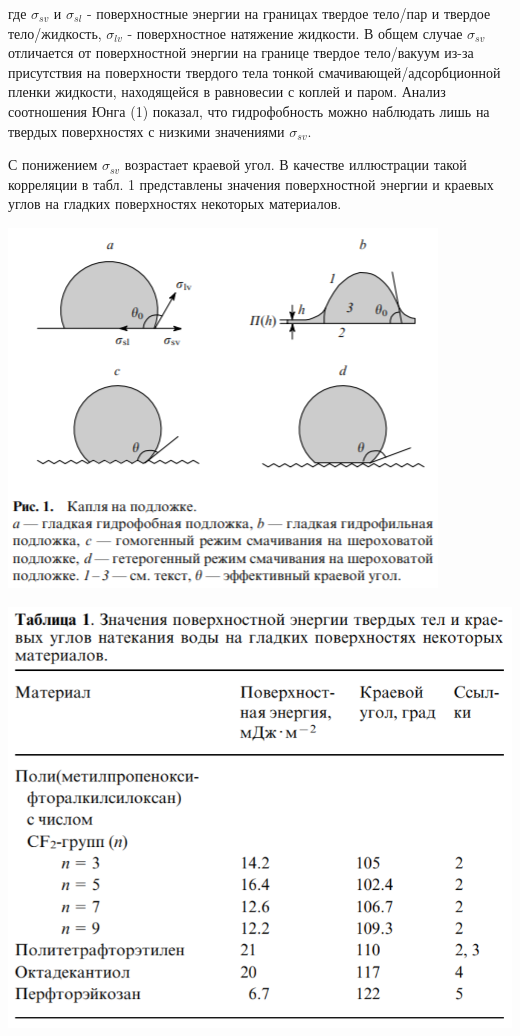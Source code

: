 \documentclass[11pt]{article}
\begin{document}
где $\sigma_{sv}$ и $\sigma_{sl}$  - поверхностные энергии на границах твердое тело/пар и твердое тело/жидкость, $\sigma_{lv}$ - поверхностное натяжение жидкости. В общем случае $\sigma_{sv}$ отличается от поверхностной энергии на границе твердое тело/вакуум из-за присутствия на поверхности твердого тела тонкой смачивающей/адсорбционной пленки жидкости, находящейся в равновесии с коплей и паром. Анализ соотношения Юнга (1) показал, что гидрофобность можно наблюдать лишь на твердых поверхностях с низкими значениями $\sigma_{sv}$.

\indent С понижением $\sigma_{sv}$ возрастает краевой угол. В качестве иллюстрации такой корреляции в табл. 1 представлены значения поверхностной энергии и краевых углов на гладких поверхностях некоторых материалов.

\vspace{0.5cm}

\includegraphics[scale=1.4]{vpv1.png}

\vspace{0.5cm}

\includegraphics[scale=0.8]{table1.png}
\end{document}
